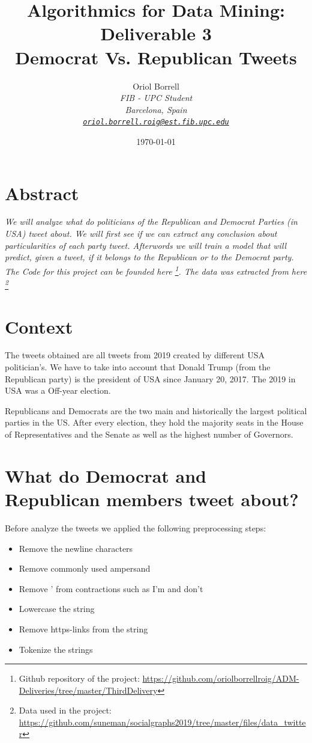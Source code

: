 \documentclass{article}
\title{
\textbf{Algorithmics for Data Mining: Deliverable 3\\} \Large{
    Democrat Vs. Republican Tweets}}
\author{Oriol Borrell\\
\textit{\small FIB - UPC Student} \\
\textit{\small Barcelona, Spain} \\
\textit{\texttt{\href{mailto:oriol.borrell.roig@est.fib.upc.edu}
{\small oriol.borrell.roig@est.fib.upc.edu}}}}
\date{\today}
\begin{document}
\maketitle

\section{Abstract}

\textit{
We will analyze what do politicians of the Republican and Democrat Parties (in USA) tweet about. We will first see if we can extract any conclusion about particularities of each party tweet. Afterwords we will train a model that will predict, given a tweet, if it belongs to the Republican or to the Democrat party.
The Code for this project can be founded here \footnote{Github repository of the project: \url{https://github.com/oriolborrellroig/ADM-Deliveries/tree/master/ThirdDelivery}}. The data was extracted from here \footnote{Data used in the project: \url{https://github.com/suneman/socialgraphs2019/tree/master/files/data_twitter}}
}

\section{Context}
\label{Context}
The tweets obtained are all tweets from 2019 created by different USA politician's. We have to take into account that Donald Trump (from the Republican party) is the president of USA since January 20, 2017. The 2019 in USA was a Off-year election.

Republicans and Democrats are the two main and historically the largest political parties in the US. After every election, they hold the majority seats in the House of Representatives and the Senate as well as the highest number of Governors.

\section{What do Democrat and Republican members tweet about?}
\label{sec:Wordcloud}

Before analyze the tweets we applied the following preprocessing steps:
\begin{itemize}
    \item Remove the newline characters
    \item Remove commonly used ampersand
    \item Remove ' from contractions such as I'm and don't
    \item Lowercase the string
    \item Remove https-links from the string
    \item Tokenize the strings
\end{itemize}
\end{document}
